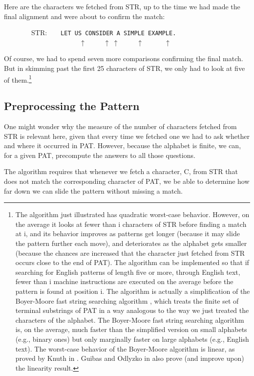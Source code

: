 \documentclass[11pt]{book}
\newenvironment{pubasis}{\begin{flushleft}\ttfamily\small}{\normalsize\rmfamily\end{flushleft}}
\newcommand{\pubdefaulttextsize}{\large}
\begin{document}
Here are the characters we fetched from STR, up to the time we had
made the final alignment and were about to confirm the match:
\begin{pubasis}
~~~~~~~~STR:~~~~\verb*+LET US CONSIDER A SIMPLE EXAMPLE.+\\
~~~~~~~~~~~~~~~~~~~~~~$\uparrow$~~~~~$\uparrow~\uparrow$~~~~~$\uparrow$~~~~~~$\uparrow$\\
\end{pubasis}
Of course, we had to spend seven more comparisons confirming the final match.
But in skimming past the first 25 characters of STR, we only had to look
at five of them.\footnote{The algorithm just illustrated has quadratic worst-case behavior. However, on the average it looks at fewer than i characters of STR before finding a match at i, and its behavior improves as patterns get longer (because it may slide the pattern further each move), and deteriorates as the alphabet gets smaller (because the chances are increased that the character just fetched from STR occurs close to the end of PAT). The algorithm can be implemented so that if searching for English patterns of length five or more, through English text, fewer than i machine instructions are executed on the average before the pattern is found at position i. The algorithm is actually a simplification of the Boyer-Moore fast string searching algorithm \cite{FSTRPOS}, which treats the finite set of terminal substrings of PAT in a way analogous to the way we just treated the characters of the alphabet.  The Boyer-Moore fast string searching algorithm is, on the average, much faster than the simplified version on small alphabets (e.g., binary ones) but only marginally faster on large alphabets (e.g., English text). The worst-case behavior of the Boyer-Moore algorithm is linear, as proved by Knuth in \cite{KMP}.  Guibas and Odlyzko in \cite{GUIBAS} also prove (and improve upon) the linearity result.}
\subsection{Preprocessing the Pattern}
\pubdefaulttextsize
One might wonder why the measure of the number of characters fetched
from STR is relevant here, given that every time we fetched one
we had to ask whether and where it occurred in PAT.  However,
because the alphabet is finite, we can, for a given PAT, precompute the
answers to all those questions.

The algorithm requires that whenever we fetch a character, C, from
STR that does not match the corresponding character of PAT, we be able
to determine how far down we can slide the pattern without missing
a match.
\end{document}
